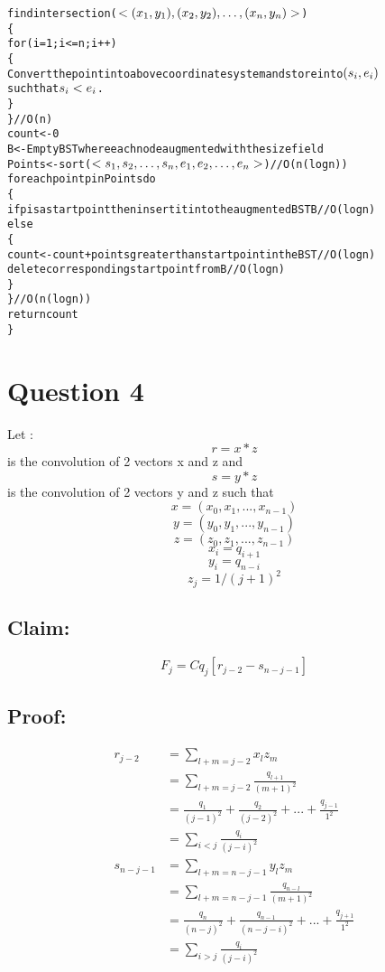 \documentclass{article}
\begin{document}
\begin{alltt}
findintersection(\(<(x\sb1,y\sb1),(x\sb2,y\sb2),\ldots ,(x\sb{n},y\sb{n})>\)) 
\{ 
for (i=1;i<=n;i++)
    \{
        Convert the point into above coordinate system and store into \((s\sb{i},e\sb{i})\) 
        such that \(s\sb{i} < e\sb{i}\) .
    \}
\}                                                                           // O (n)
count <- 0 
B <- Empty BST where each node augmented with the size field
Points <- sort (\(<s\sb1,s\sb2,\ldots,s\sb{n},e\sb1,e\sb2,\ldots,e\sb{n}>\))                              //O(n(log n)) 
foreach point p in Points do 
    \{
    if p is a start point then insert it into the augmented BST B            // O(log n)
    else 
        \{  
            count <- count + points greater than start point in the BST      // O(log n)
            delete corresponding startpoint from B                           // O(log n)
        \}
    \}                                                                       // O(n(log n))
    return count 
\}
\end{alltt}
	
 
\section*{Question 4}
Let : 
\[r = x * z \] is the convolution of 2 vectors x and z and \\
\[s = y * z \] is the convolution of 2 vectors y and z such that
\[x = (x_{0},x_{1},...,x_{n-1})\]
\[y = (y_{0},y_{1},...,y_{n-1})\]
\[z = (z_{0},z_{1},...,z_{n-1})\]
\[x_{i} = q_{i+1}\]
\[y_{i} = q_{n-i}\]
\[z_{j} = 1/(j+1)^2\]

\subsection*{Claim:} \[F_j = Cq_j[r_{j-2} - s_{n-j-1}]\]

\subsection*{Proof:}
\begin{align*}
r_{j-2} & = \sum_{l+m=j-2} x_lz_m \\
&= \sum_{l+m=j-2} \frac{q_{l+1}}{(m+1)^2} \\
&= \frac{q_1}{(j-1)^2} + \frac{q_2}{(j-2)^2} + ... + \frac{q_{j-1}}{1^2} \\
&= \sum_{i<j} \frac{q_i}{(j-i)^2} \\
s_{n-j-1} & = \sum_{l+m=n-j-1} y_lz_m \\
&= \sum_{l+m=n-j-1} \frac{q_{n-l}}{(m+1)^2} \\
&= \frac{q_n}{(n-j)^2} + \frac{q_{n-1}}{(n-j-i)^2} + ... + \frac{q_{j+1}}{1^2} \\
&= \sum_{i>j} \frac{q_i}{(j-i)^2} \\ 
\end{align*}
\end{document}

